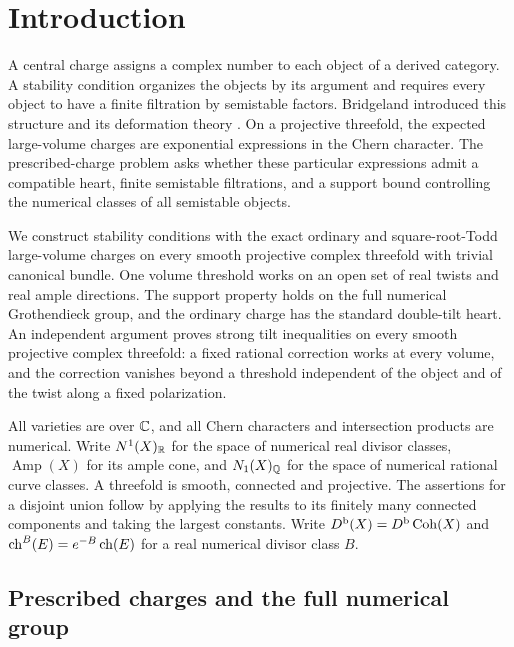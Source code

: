 \section{Introduction}\label{sec:introduction}

A central charge assigns a complex number to each object of a derived
category. A stability condition organizes the objects by its argument and
requires every object to have a finite filtration by semistable factors.
Bridgeland introduced this structure and its deformation theory
\cite{Bridgeland2007}. On a projective threefold, the expected large-volume
charges are exponential expressions in the Chern character. The
prescribed-charge problem asks whether these particular expressions admit
a compatible heart, finite semistable filtrations, and a support bound
controlling the numerical classes of all semistable objects.

We construct stability conditions with the exact ordinary and
square-root-Todd large-volume charges on every smooth projective complex
threefold with trivial canonical bundle. One volume threshold works on an
open set of real twists and real ample directions. The support property
holds on the full numerical Grothendieck group, and the ordinary charge
has the standard double-tilt heart. An independent argument proves strong
tilt inequalities on every smooth projective complex threefold: a fixed
rational correction works at every volume, and the correction vanishes
beyond a threshold independent of the object and of the twist along a
fixed polarization.

All varieties are over $\mathbb C$, and all Chern characters and intersection
products are numerical. Write $N^1(X)_{\mathbb R}$ for the space of numerical
real divisor classes, $\operatorname{Amp}(X)$ for its ample cone, and
$N_1(X)_{\mathbb Q}$ for the space of numerical rational curve classes.
A threefold is smooth, connected and projective.
The assertions for a disjoint union follow by applying the results to
its finitely many connected components and taking the largest constants.
Write $D^{\mathrm b}(X)=D^{\mathrm b}\operatorname{Coh}(X)$ and
$\operatorname{ch}^B(E)=e^{-B}\operatorname{ch}(E)$ for a real numerical divisor class $B$.

\subsection{Prescribed charges and the full numerical group}

